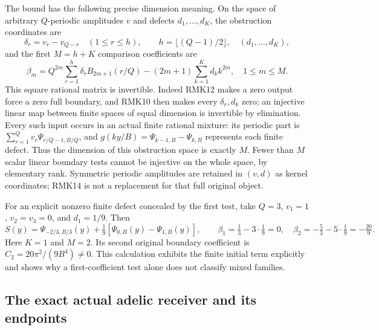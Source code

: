 \documentclass[11pt]{article}
\begin{document}
The bound has the following precise dimension meaning. On the space
of arbitrary $Q$-periodic amplitudes $v$ and defects $d_1,\ldots,d_K$,
the obstruction coordinates are
\begin{equation}\tag{RMK14}
 \delta_r=v_r-v_{Q-r}\quad(1\leq r\leq h),\qquad
 h=\lfloor(Q-1)/2\rfloor,
 \quad(d_1,\ldots,d_K),
\end{equation}
and the first $M=h+K$ comparison coefficients are
\begin{equation}\tag{RMK15}
 \beta_m=Q^{2m}\sum_{r=1}^h
       \delta_r B_{2m+1}(r/Q)
       -(2m+1)\sum_{k=1}^K d_k k^{2m},
       \quad1\leq m\leq M.
\end{equation}
This square rational matrix is invertible. Indeed RMK12 makes a
zero output force a zero full boundary, and RMK10 then makes every
$\delta_r,d_k$ zero; an injective linear map between finite spaces
of equal dimension is invertible by elimination. Every such input
occurs in an actual finite rational mixture: its periodic part is
$\sum_{r=1}^Qv_r\Psi_{r/Q-1,B/Q}$, and
$g(ky/B)=\Psi_{k-1,B}-\Psi_{k,B}$ represents each finite defect.
Thus the dimension of this obstruction space is exactly $M$.
Fewer than $M$ scalar linear boundary tests cannot be injective on
the whole space, by elementary rank. Symmetric periodic amplitudes
are retained in $(v,d)$ as kernel coordinates; RMK14 is not a
replacement for that full original object.

For an explicit nonzero finite defect concealed by the first test,
take $Q=3$, $v_1=1$, $v_2=v_3=0$, and $d_1=1/9$. Then
\begin{equation}\tag{RMK16}
 S(y)=\Psi_{-2/3,B/3}(y)
             +\tfrac19[\Psi_{0,B}(y)-\Psi_{1,B}(y)],\qquad
 \beta_1=\tfrac13-3\cdot\tfrac19=0,\quad
 \beta_2=-\tfrac53-5\cdot\tfrac19=-\tfrac{20}{9}.
\end{equation}
Here $K=1$ and $M=2$. Its second original boundary coefficient is
$C_2=20\pi^2/(9B^4)\ne0$. This calculation exhibits the finite
initial term explicitly and shows why a first-coefficient test alone
does not classify mixed families.

\subsection{The exact actual adelic receiver and its endpoints}
\end{document}
